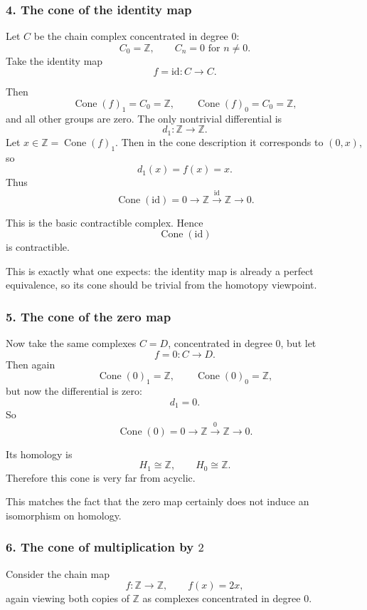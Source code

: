 \documentclass[12pt,a4paper]{article}
\theoremstyle{notespace}
\begin{document}
\subsubsection*{4. The cone of the identity map}

Let \(C\) be the chain complex concentrated in degree \(0\):
\[
C_0=\mathbb Z,\qquad C_n=0 \text{ for } n\neq 0.
\]
Take the identity map
\[
f=\mathrm{id}:C\to C.
\]

Then
\[
\operatorname{Cone}(f)_1=C_0=\mathbb Z,
\qquad
\operatorname{Cone}(f)_0=C_0=\mathbb Z,
\]
and all other groups are zero. The only nontrivial differential is
\[
d_1:\mathbb Z\to \mathbb Z.
\]
Let \(x\in \mathbb Z=\operatorname{Cone}(f)_1\). Then in the cone description it corresponds to \((0,x)\), so
\[
d_1(x)=f(x)=x.
\]
Thus
\[
\operatorname{Cone}(\mathrm{id})=
0\longrightarrow \mathbb Z \xrightarrow{\mathrm{id}} \mathbb Z \longrightarrow 0.
\]

This is the basic contractible complex. Hence
\[
\operatorname{Cone}(\mathrm{id})
\]
is contractible.

This is exactly what one expects: the identity map is already a perfect equivalence, so its cone should be trivial from the homotopy viewpoint.

\subsubsection*{5. The cone of the zero map}

Now take the same complexes \(C=D\), concentrated in degree \(0\), but let
\[
f=0:C\to D.
\]
Then again
\[
\operatorname{Cone}(0)_1=\mathbb Z,
\qquad
\operatorname{Cone}(0)_0=\mathbb Z,
\]
but now the differential is zero:
\[
d_1=0.
\]
So
\[
\operatorname{Cone}(0)=
0\longrightarrow \mathbb Z \xrightarrow{0} \mathbb Z \longrightarrow 0.
\]

Its homology is
\[
H_1\cong \mathbb Z,
\qquad
H_0\cong \mathbb Z.
\]
Therefore this cone is very far from acyclic.

This matches the fact that the zero map certainly does not induce an isomorphism on homology.

\subsubsection*{6. The cone of multiplication by \(2\)}

Consider the chain map
\[
f:\mathbb Z\to \mathbb Z,\qquad f(x)=2x,
\]
again viewing both copies of \(\mathbb Z\) as complexes concentrated in degree \(0\).
\end{document}
